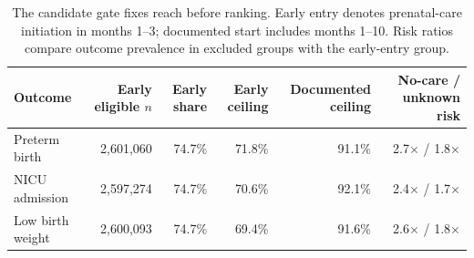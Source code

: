 \begin{table}[!htbp]
\centering
\caption{The candidate gate fixes reach before ranking. Early entry denotes prenatal-care initiation in months 1--3; documented start includes months 1--10. Risk ratios compare outcome prevalence in excluded groups with the early-entry group.}
\label{tab:candidate_gate}
\small
\setlength{\tabcolsep}{3.2pt}
\begin{tabular*}{\linewidth}{@{\extracolsep{\fill}}lrrrrr@{}}
\toprule
Outcome & Early eligible $n$ & Early share & Early ceiling & Documented ceiling & No-care / unknown risk \\
\midrule
Preterm birth & 2,601,060 & 74.7\% & 71.8\% & 91.1\% & 2.7$\times$ / 1.8$\times$ \\
NICU admission & 2,597,274 & 74.7\% & 70.6\% & 92.1\% & 2.4$\times$ / 1.7$\times$ \\
Low birth weight & 2,600,093 & 74.7\% & 69.4\% & 91.6\% & 2.6$\times$ / 1.8$\times$ \\
\bottomrule
\end{tabular*}
\end{table}

